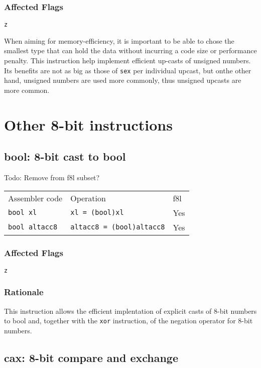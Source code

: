 \documentclass{book}
\begin{document}
\subsubsection*{Affected Flags}

\texttt{z}

When aiming for memory-efficiency, it is important to be able to chose the smallest type that can hold the data without incurring a code size or performance penalty. This instruction help implement efficient up-casts of unsigned numbers. Its benefits are not as big as those of \texttt{sex} per individual upcast, but onthe other hand, unsigned numbers are used more commonly, thus unsigned upcasts are more common.


\section{Other 8-bit instructions}

\subsection{bool: 8-bit cast to bool}

Todo: Remove from f8l subset?

\begin{tabular}{l l l}
Assembler code        & Operation                        & f8l \\
\texttt{bool xl}      & \texttt{xl = (bool)xl}           & Yes \\
\texttt{bool altacc8} & \texttt{altacc8 = (bool)altacc8} & Yes \\
\end{tabular}

\subsubsection*{Affected Flags}

\texttt{z}

\subsubsection*{Rationale}

This instruction allows the efficient implentation of explicit casts of 8-bit numbers to bool and, together with the \texttt{xor} instruction, of the negation operator for 8-bit numbers.


\subsection{cax: 8-bit compare and exchange}
\end{document}
